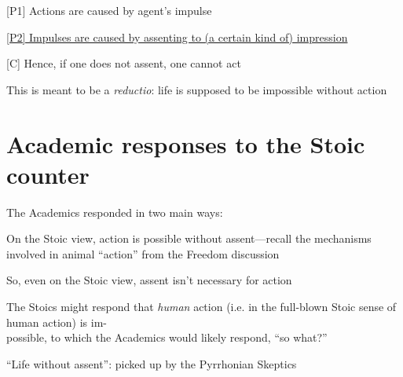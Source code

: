 \documentclass[11pt]{article}
\begin{document}
[P1] Actions are caused by agent's impulse
\vspace*{1mm}

\underline{[P2] Impulses are caused by assenting to (a certain kind of) impression}
\vspace*{1mm}

[C] Hence, if one does not assent, one cannot act
\vspace*{2mm}

\noindent This is meant to be a \emph{reductio}: life is supposed to be impossible without action

\section*{Academic responses to the Stoic counter}

\noindent The Academics responded in two main ways:
\vspace*{2mm}

\noindent [1] On the Stoic view, action is possible without assent---recall the mechanisms involved in animal ``action'' from the Freedom discussion
\vspace*{2mm}

So, even on the Stoic view, assent isn't necessary for action
\vspace*{1mm}

The Stoics might respond that \emph{human} action (i.e. in the full-blown Stoic sense of human action) is im-\\\hspace*{6mm}possible, to which the Academics would likely respond, ``so what?''
\vspace*{2mm}

\noindent [2] ``Life without assent'': picked up by the Pyrrhonian Skeptics
\end{document}
